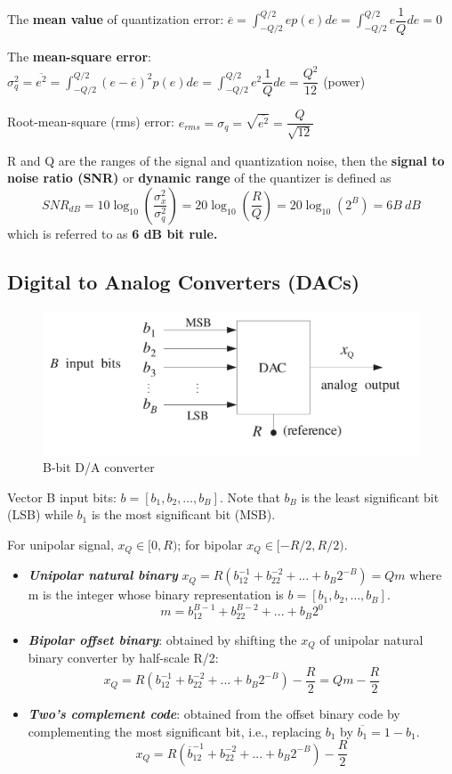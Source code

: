 The \textbf{mean value} of quantization error: $\displaystyle \overline{e}=\int_{-Q/2}^{Q/2} ep(e)de = \int_{-Q/2}^{Q/2}e\dfrac{1}{Q}de=0$

The \textbf{mean-square error}: $\sigma^2_q = \displaystyle \overline{e^2}=\int_{-Q/2}^{Q/2} (e-\overline{e})^2p(e)de = \int_{-Q/2}^{Q/2}e^2\dfrac{1}{Q}de=\dfrac{Q^2}{12}$ (power)

Root-mean-square (rms) error: $e_{rms}=\sigma_q=\sqrt{\overline{e^2}}=\dfrac{Q}{\sqrt{12}}$

R and Q are the ranges of the signal and quantization noise, then the \textbf{signal to noise ratio (SNR)} or \textbf{dynamic range} of the quantizer is defined as
\begin{equation*}
    SNR_{dB} = 10\log_{10}\left(\frac{\sigma^2_x}{\sigma^2_q}\right)=20\log_{10}\left(\frac{R}{Q}\right)=20\log_{10}(2^B)=6B\ dB
\end{equation*}
which is referred to as \textbf{6 dB bit rule.}
\subsection{Digital to Analog Converters (DACs)}
\begin{figure}[h!]
    \centering
    \includegraphics[width=0.5\linewidth]{img/20.png}
    \caption{B-bit D/A converter}
\end{figure}
Vector B input bits: $b=[b_1, b_2,…,b_B]$. Note that $b_B$ is the least significant bit (LSB) while $b_1$ is the most significant bit (MSB).

For unipolar signal, $x_Q \in [0, R)$; for bipolar $x_Q \in [-R/2, R/2)$.
\begin{itemize}
    \item \textbf{\textit{Unipolar natural binary}} $x_Q=R(b_12^{-1}+b_22^{-2}+...+b_B2^{-B})=Qm$ where m is the integer whose binary representation is $b=[b_1, b_2,…,b_B]$.
    \begin{equation*}
        m = b_12^{B-1}+b_22^{B-2}+...+b_B2^{0}
    \end{equation*}
    \item \textbf{\textit{Bipolar offset binary}}: obtained by shifting the $x_Q$ of unipolar natural binary converter by half-scale R/2:
    \begin{equation*}
        x_Q = R(b_12^{-1}+b_22^{-2}+...+b_B2^{-B})-\dfrac{R}{2}=Qm-\dfrac{R}{2}
    \end{equation*}
    \item \textbf{\textit{Two’s complement code}}: obtained from the offset binary code by complementing the most significant bit, i.e., replacing $b_1$ by $\overline{b_1}=1-b_1$.
    \begin{equation*}
         x_Q = R(\overline{b}_12^{-1}+b_22^{-2}+...+b_B2^{-B})-\dfrac{R}{2}
    \end{equation*}
\end{itemize}
